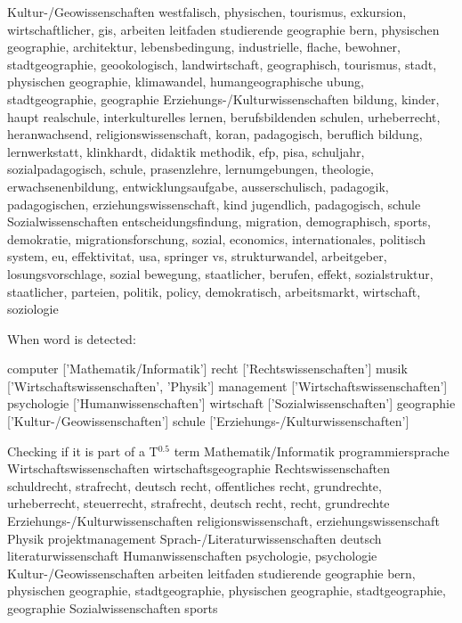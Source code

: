 Kultur-/Geowissenschaften           westfalisch, physischen, tourismus, exkursion, wirtschaftlicher, gis, arbeiten leitfaden studierende geographie bern, physischen geographie, architektur, lebensbedingung, industrielle, flache, bewohner, stadtgeographie, geookologisch, landwirtschaft, geographisch, tourismus, stadt, physischen geographie, klimawandel, humangeographische ubung, stadtgeographie, geographie
Erziehungs-/Kulturwissenschaften    bildung, kinder, haupt realschule, interkulturelles lernen, berufsbildenden schulen, urheberrecht, heranwachsend, religionswissenschaft, koran, padagogisch, beruflich bildung, lernwerkstatt, klinkhardt, didaktik methodik, efp, pisa, schuljahr, sozialpadagogisch, schule, prasenzlehre, lernumgebungen, theologie, erwachsenenbildung, entwicklungsaufgabe, ausserschulisch, padagogik, padagogischen, erziehungswissenschaft, kind jugendlich, padagogisch, schule
Sozialwissenschaften                entscheidungsfindung, migration, demographisch, sports, demokratie, migrationsforschung, sozial, economics, internationales, politisch system, eu, effektivitat, usa, springer vs, strukturwandel, arbeitgeber, losungsvorschlage, sozial bewegung, staatlicher, berufen, effekt, sozialstruktur, staatlicher, parteien, politik, policy, demokratisch, arbeitsmarkt, wirtschaft, soziologie


When word is detected:

computer ['Mathematik/Informatik']
recht ['Rechtswissenschaften']
musik ['Wirtschaftswissenschaften', 'Physik']
management ['Wirtschaftswissenschaften']
psychologie ['Humanwissenschaften']
wirtschaft ['Sozialwissenschaften']
geographie ['Kultur-/Geowissenschaften']
schule ['Erziehungs-/Kulturwissenschaften']

Checking if it is part of a T$^{0.5}$ term
Mathematik/Informatik               programmiersprache
Wirtschaftswissenschaften           wirtschaftsgeographie
Rechtswissenschaften                schuldrecht, strafrecht, deutsch recht, offentliches recht, grundrechte, urheberrecht, steuerrecht, strafrecht, deutsch recht, recht, grundrechte
Erziehungs-/Kulturwissenschaften    religionswissenschaft, erziehungswissenschaft
Physik                              projektmanagement
Sprach-/Literaturwissenschaften     deutsch literaturwissenschaft
Humanwissenschaften                 psychologie, psychologie
Kultur-/Geowissenschaften           arbeiten leitfaden studierende geographie bern, physischen geographie, stadtgeographie, physischen geographie, stadtgeographie, geographie
Sozialwissenschaften                sports





